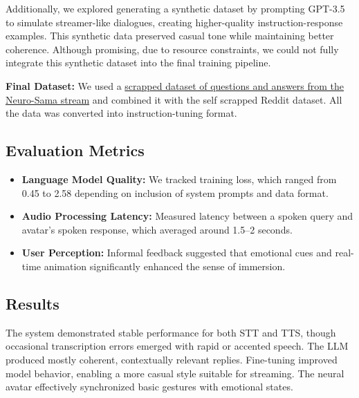 \documentclass[conference]{IEEEtran}
\begin{document}
        Additionally, we explored generating a synthetic dataset by prompting GPT-3.5 to simulate streamer-like dialogues, creating higher-quality instruction-response examples. This synthetic data preserved casual tone while maintaining better coherence. Although promising, due to resource constraints, we could not fully integrate this synthetic dataset into the final training pipeline.

        \textbf{Final Dataset:} We used a \href{https://huggingface.co/datasets/neifuisan/Neuro-sama-QnA}{scrapped dataset of questions and answers from the Neuro-Sama stream} and combined it with the self scrapped Reddit dataset. All the data was converted into instruction-tuning format.
    

\subsection{Evaluation Metrics}
\begin{itemize}
    \item \textbf{Language Model Quality:} We tracked training loss, which ranged from 0.45 to 2.58 depending on inclusion of system prompts and data format.
    \item \textbf{Audio Processing Latency:} Measured latency between a spoken query and avatar’s spoken response, which averaged around 1.5–2 seconds.
    \item \textbf{User Perception:} Informal feedback suggested that emotional cues and real-time animation significantly enhanced the sense of immersion.
\end{itemize}

\subsection{Results}
The system demonstrated stable performance for both STT and TTS, though occasional transcription errors emerged with rapid or accented speech. The LLM produced mostly coherent, contextually relevant replies. Fine-tuning improved model behavior, enabling a more casual style suitable for streaming. The neural avatar effectively synchronized basic gestures with emotional states.
\end{document}
